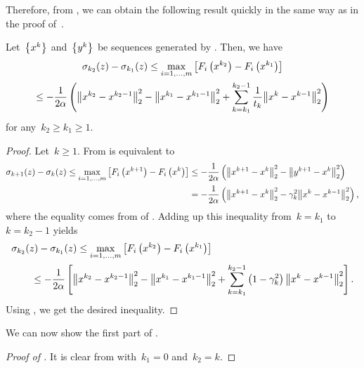 \documentclass[../main]{subfiles}
\begin{document}
Therefore, from , we can obtain the following result quickly in the same way as in the proof of~\cite[Corollary 5.1]{Tanabe2022a}.
\begin{lemma} 
    Let~$\set*{x^k}$ and~$\set*{y^k}$ be sequences generated by .
    Then, we have
    \begin{multline}
        \sigma_{k_2}(z) - \sigma_{k_1}(z) \le \max_{i = 1, \dots, m} \left[ F_i\left(x^{k_2}\right) - F_i\left( x^{k_1} \right)  \right] \\
        \le - \frac{1}{2 \alpha} \left( \norm*{x^{k_2} - x^{k_2 - 1}}_2^2 - \norm*{x^{k_1} - x^{k_1 - 1}}_2^2 + \sum_{k = k_1}^{k_2 - 1} \frac{1}{t_k} \norm*{x^k - x^{k - 1}}_2^2 \right)
    \end{multline}
    for any~$k_2 \ge k_1 \ge 1$.
\end{lemma}
\begin{proof}
    Let~$k \ge 1$.
    From  is equivalent to
    \begin{align}
        \sigma_{k + 1}(z) - \sigma_k(z) \le \max_{i = 1, \dots, m} \left[ F_i\left(x^{k + 1}\right) - F_i\left( x^k \right) \right] & \le - \frac{1}{2 \alpha} \left( \norm*{x^{k + 1} - x^k}_2^2 - \norm*{y^{k + 1} - x^k}_2^2 \right)          \\
                                                                                                                                    & = - \frac{1}{2 \alpha} \left( \norm*{x^{k + 1} - x^k}_2^2 - \gamma_k^2 \norm*{x^k - x^{k - 1}}_2^2 \right)
        ,\end{align}
    where the equality comes from  of .
    Adding up this inequality from~$k = k_1$ to~$k = k_2 - 1$ yields
    \begin{align}
        \MoveEqLeft \sigma_{k_2}(z) - \sigma_{k_1}(z) \le \max_{i = 1, \dots, m} \left[ F_i\left( x^{k_2} \right) - F_i\left( x^{k_1} \right)  \right]                                                        \\
         & \le - \frac{1}{2 \alpha} \left[ \norm*{x^{k_2} - x^{k_2 - 1}}_2^2 - \norm*{x^{k_1} - x^{k_1 - 1}}_2^2 + \sum_{k = k_1}^{k_2 - 1} \left( 1 - \gamma_k^2 \right) \norm*{x^k - x^{k - 1}}_2^2 \right]
        .\end{align}
    Using , we get the desired inequality.
\end{proof}

We can now show the first part of .
\begin{proof}[Proof of ]
    It is clear from  with~$k_1 = 0$ and~$k_2 = k$.
\end{proof}
\end{document}
